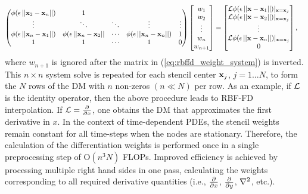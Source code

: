 \documentclass{report}
\begin{document}
{\begin{align}
\begin{pmatrix}
\phi(\epsilon\left|\left|\mathbf{x}_2-\mathbf{x}_n\right|\right|) & 1\\
\vdots & \ddots & \ddots & \vdots & \vdots\\
\phi(\epsilon\left|\left|\mathbf{x}_n-\mathbf{x}_1\right|\right|) & \phi(\epsilon\left|\left|\mathbf{x}_n-\mathbf{x}_2\right|\right| & \cdots &
\phi(\epsilon\left|\left|\mathbf{x}_n-\mathbf{x}_n\right|\right|) & 1 \\
1 & 1 & \cdots & 1 & 0
\end{pmatrix}
\begin{bmatrix} w_1 \\ w_2 \\ \vdots \\ w_n  \\ w_{n+1}\end{bmatrix}
&=
\begin{bmatrix} \mathcal{L}\phi(\epsilon\left|\left|\mathbf{x}-\mathbf{x}_{1}\right|\right|)|_{\mathbf{x}=\mathbf{x}_{j}} \\
                \mathcal{L}\phi(\epsilon\left|\left|\mathbf{x}-\mathbf{x}_{2}\right|\right|)|_{\mathbf{x}=\mathbf{x}_{j}} \\ \vdots \\  \mathcal{L}\phi(\epsilon\left|\left|\mathbf{x}-\mathbf{x}_{n}\right|\right|)|_{\mathbf{x}=\mathbf{x}_{j}}\\
                0
\end{bmatrix},
\label{eq:rbffd_weight_system}
\end{align}
where $w_{n+1}$ is ignored after the matrix in ({\ref{eq:rbffd_weight_system}}) is inverted.
This $n \times n$ system solve is repeated for each stencil center  $\mathbf{x}_j$, $j=1...N$, to form the $N$ rows of the DM  with $n$ non-zeros $(n\ll N)$ per row.
As an example, if $\diffop$ is the identity operator, 
then the above procedure leads to RBF-FD interpolation. If $\mathcal{L}=\frac{\partial }{\partial x}$, one obtains the DM that approximates the first derivative in $x$. In the context of time-dependent PDEs,  the stencil weights remain constant for all time-steps when the nodes are stationary. Therefore, the calculation of the 
differentiation weights is performed once in a single preprocessing step of O$(n^3N)$ 
FLOPs.
Improved efficiency is achieved
by processing multiple right hand sides in one pass, calculating the weights
corresponding to all required derivative quantities (i.e., $\frac{\partial }{\partial x}$, $\frac{\partial }{\partial y}$, $\Laplacian$, etc.).


}
\end{document}
